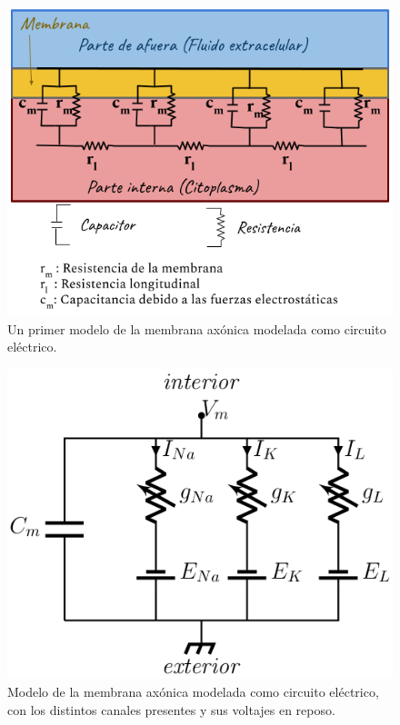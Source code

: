 \begin{figure}[h]
 \centering
 \includegraphics[scale=0.5]{../Figuras/ModeloHH.2}
 \caption{Un primer modelo de la membrana axónica modelada como circuito eléctrico.}
 \label{fig:ModelHh}
\end{figure}



\begin{figure}[h]
 \centering
 \includegraphics[scale=0.5]{../Figuras/circuito.png}
 \caption{Modelo de la membrana axónica modelada como circuito eléctrico, con los distintos canales presentes y sus voltajes en reposo.}
 \label{fig:circuito}
\end{figure}

